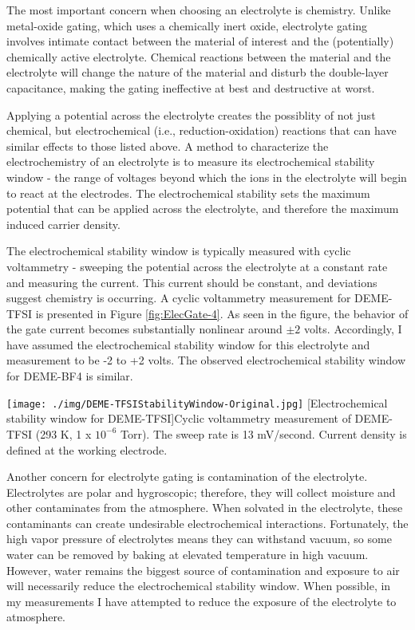 The most important concern when choosing an electrolyte is chemistry. Unlike metal-oxide gating, which uses a chemically inert oxide, electrolyte gating involves intimate contact between the material of interest and the (potentially) chemically active electrolyte. Chemical reactions between the material and the electrolyte will change the nature of the material and disturb the double-layer capacitance, making the gating ineffective at best and destructive at worst. 

Applying a potential across the electrolyte creates the possiblity of not just chemical, but electrochemical (i.e., reduction-oxidation) reactions that can have similar effects to those listed above. A method to characterize the electrochemistry of an electrolyte is to measure its electrochemical stability window - the range of voltages beyond which the ions in the electrolyte will begin to react at the electrodes. The electrochemical stability sets the maximum potential that can be applied across the electrolyte, and therefore the maximum induced carrier density.

The electrochemical stability window is typically measured with cyclic voltammetry - sweeping the potential across the electrolyte at a constant rate and measuring the current. This current should be constant, and deviations suggest chemistry is occurring. A cyclic voltammetry measurement for DEME-TFSI is presented in Figure \ref{fig:ElecGate-4}. As seen in the figure, the behavior of the gate current becomes substantially nonlinear around $\pm 2$ volts. Accordingly, I have assumed the electrochemical stability window for this electrolyte and  measurement to be -2 to +2 volts. The observed electrochemical stability window for DEME-BF4 is similar.

\begin{centering}
\texttt{[image: ./img/DEME-TFSIStabilityWindow-Original.jpg]}
  \captionsetup{width=0.75\textwidth}
  [Electrochemical stability window for DEME-TFSI]{Cyclic voltammetry measurement of DEME-TFSI (293 K, 1 x $10^{-6}$ Torr). The sweep rate is 13 mV/second. Current density is defined at the working electrode.} 
  \label{fig:ElecGate-4}
\end{centering}

Another concern for electrolyte gating is contamination of the electrolyte. Electrolytes are polar and hygroscopic; therefore, they will collect moisture and other contaminates from the atmosphere. When solvated in the electrolyte, these contaminants can create undesirable electrochemical interactions. Fortunately, the high vapor pressure of electrolytes means they can withstand vacuum, so some water can be removed by baking at elevated temperature in high vacuum. However, water remains the biggest source of contamination and exposure to air will necessarily reduce the electrochemical stability window. When possible, in my measurements I have attempted to reduce the exposure of the electrolyte to atmosphere.

